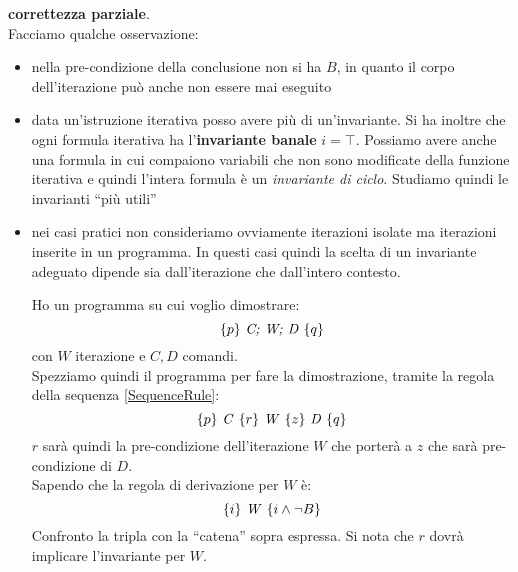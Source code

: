 			\textbf{correttezza parziale}.\\
			Facciamo qualche osservazione:
			\begin{itemize}
				\item nella pre-condizione della conclusione non si ha $B$, in quanto il
				      corpo dell'iterazione può anche non essere mai eseguito
				\item data un'istruzione iterativa posso avere più di un'invariante. Si ha
				      inoltre che ogni formula iterativa ha l'\textbf{invariante banale}
				      $i=\top$. Possiamo avere anche una formula in cui compaiono variabili che
				      non sono modificate della funzione iterativa e quindi l'intera formula è un
				      \textit{invariante di ciclo}. Studiamo quindi le invarianti ``più utili''
				\item nei casi pratici non consideriamo ovviamente iterazioni isolate ma
				      iterazioni inserite in un programma. In questi casi quindi la scelta di un
				      invariante adeguato dipende sia dall'iterazione che dall'intero contesto.
				      \begin{esempio}
				      	Ho un programma su cui voglio dimostrare:
				      	\[\{p\}\mbox{ \textit{C; W; D} }\{q\}\]
				      	con $W$ iterazione e $C,D$ comandi.\\
				      	Spezziamo quindi il programma per fare la dimostrazione, tramite la regola
				      	della sequenza \ref{SequenceRule}:
				      	\[\{p\}\mbox{ \textit{C} }\{r\}\mbox{ \textit{W} }\{z\}\mbox{ \textit{D}
				      			}\{q\}\]
				      		$r$ sarà quindi la pre-condizione dell'iterazione $W$ che porterà a $z$ che
				      		sarà pre-condizione di $D$.\\
				      		Sapendo che la regola di derivazione per $W$ è:
				      		\[\{i\}\mbox{ \textit{W} }\{i\land\neg B\}\]
				      		Confronto la tripla con la ``catena'' sopra espressa. Si nota che $r$
				      		dovrà implicare l'invariante per $W$.
				      		\end{esempio}
				      		\end{itemize}
